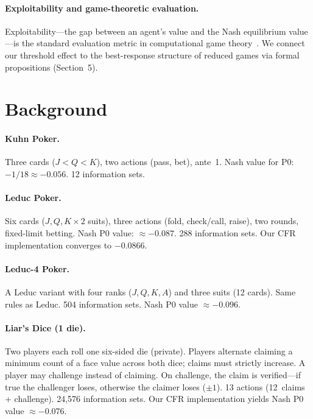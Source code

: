 \documentclass{article}
\begin{document}
\paragraph{Exploitability and game-theoretic evaluation.}
Exploitability---the gap between an agent's value and the Nash equilibrium value---is the standard evaluation metric in computational game theory~\citep{johanson2007computing,timbers2022approximate}. We connect our threshold effect to the best-response structure of reduced games via formal propositions (Section~5).

\section{Background}

\paragraph{Kuhn Poker.}
Three cards ($J < Q < K$), two actions (pass, bet), ante~1. Nash value for P0: $-1/18 \approx -0.056$. 12 information sets.

\paragraph{Leduc Poker.}
Six cards ($J, Q, K \times 2$ suits), three actions (fold, check/call, raise), two rounds, fixed-limit betting. Nash P0 value: $\approx -0.087$. 288 information sets. Our CFR implementation converges to $-0.0866$.

\paragraph{Leduc-4 Poker.}
A Leduc variant with four ranks ($J, Q, K, A$) and three suits (12 cards). Same rules as Leduc. 504 information sets. Nash P0 value $\approx -0.096$.

\paragraph{Liar's Dice (1 die).}
Two players each roll one six-sided die (private). Players alternate claiming a minimum count of a face value across both dice; claims must strictly increase. A player may challenge instead of claiming. On challenge, the claim is verified---if true the challenger loses, otherwise the claimer loses ($\pm 1$). 13 actions (12~claims + challenge). 24{,}576 information sets. Our CFR implementation yields Nash P0 value $\approx -0.076$.
\end{document}
